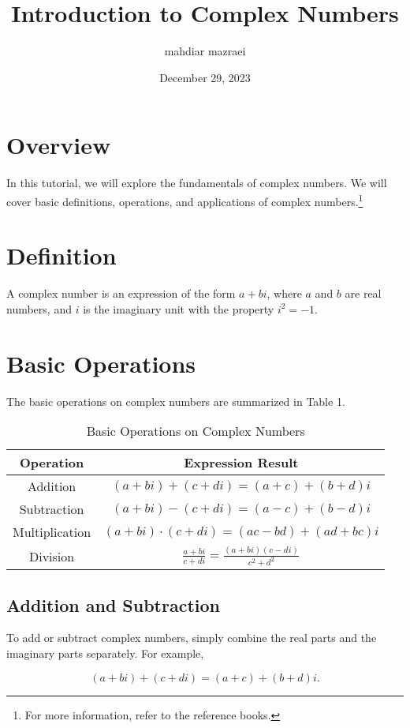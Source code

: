 \documentclass{article}
\title{Introduction to Complex Numbers}
\author{mahdiar mazraei}
\date{December 29, 2023}
\begin{document}
\maketitle

\section*{Overview}

In this tutorial, we will explore the fundamentals of complex numbers. We will cover basic definitions, operations, and applications of complex numbers.\footnote{For
more information, refer to the reference books.}

\section{Definition}

A complex number is an expression of the form $a + bi$, where $a$ and $b$ are real numbers, and $i$ is the imaginary unit with the property $i^2 = -1$.

\section{Basic Operations}

The basic operations on complex numbers are summarized in Table 1.

\begin{table}[h]
\centering
\caption{Basic Operations on Complex Numbers}
\begin{tabular}{|c|c|}
\hline
Operation & Expression Result \\ \hline
Addition & $(a + bi) + (c + di) = (a + c) + (b + d)i$ \\
Subtraction & $(a + bi) - (c + di) = (a - c) + (b - d)i$ \\
Multiplication & $(a + bi) \cdot (c + di) = (ac - bd) + (ad + bc)i$ \\
Division & $\frac{a + bi}{c + di} = \frac{(a + bi)(c - di)}{c^2 + d^2}$ \\
\hline
\end{tabular}
\end{table}
\subsection{Addition and Subtraction}
To add or subtract complex numbers, simply combine the real parts and the
imaginary parts separately. For example,

\[
(a + bi) + (c + di) = (a + c) + (b + d)i.
\]
\end{document}
